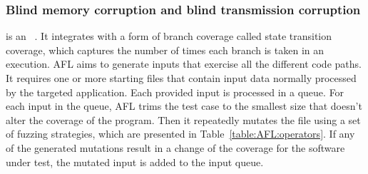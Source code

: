 
\subsubsection{Blind memory corruption and blind transmission corruption}





 is an ~\cite{gutmann2016fuzzing}. It integrates  with a form of branch coverage called state transition coverage,
which captures the number of times each branch is taken in an execution. 
AFL aims to generate inputs that exercise all the different code paths.
It requires one or more starting files that contain input data normally processed by the targeted application. 
Each provided input is processed in a queue. For each input in the queue, AFL trims the test case to the smallest size that doesn't alter the coverage of the program. Then it repeatedly mutates the file using a set of fuzzing strategies, which are presented in Table~\ref{table:AFL:operators}.
If any of the generated mutations result in a change of the coverage for the software under test, the mutated input is added to the input queue.

